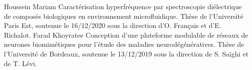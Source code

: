\begin{cvskills}
\cvskill
    {Houssein Mariam} %
    {Caractérisation hyperfréquence par spectroscopie diélectrique de composés biologiques en environnement microfluidique. Thèse de l'Université Paris Est, soutenue le 16/12/2020 sous la direction d'O. Français et d'E. Richalot.
    } %
\cvskill
    {Farad Khoyratee} %
    {Conception d’une plateforme modulable de réseaux de neurones biomimétiques pour l’étude des maladies neurodégénératives. Thèse de l'Université de Bordeaux, soutenue le 13/12/2019 sous la direction de S. Saïghi et de T. Lévi.
    } %
\end{cvskills}